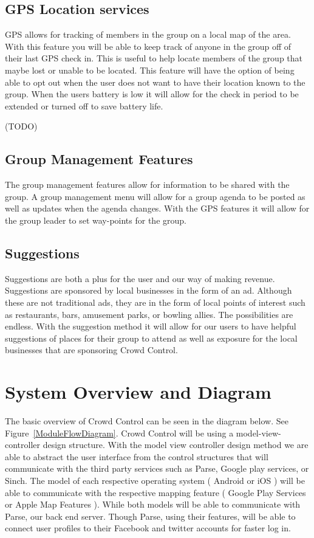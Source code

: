 \subsection{GPS Location services}
GPS allows for tracking of members in the group on a local map of the area. With this feature you will be able to keep track of anyone in the group off of their last GPS check in. This is useful to help locate members of the group that maybe lost or unable to be located. This feature will have the option of being able to opt out when the user does not want to have their location known to the group. When the users battery is low it will allow for the check in period to be extended or turned off to save battery life.

(TODO)

\subsection{Group Management Features}
The group management features allow for information to be shared with the group. A group management menu will allow for a group agenda to be posted as well as updates when the agenda changes. With the GPS features it will allow for the group leader to set way-points for the group.  

\subsection{Suggestions}
Suggestions are both a plus for the user and our way of making revenue. Suggestions are sponsored by local businesses in the form of an ad. Although these are not traditional ads, they are in the form of local points of interest such as restaurants, bars, amusement parks, or bowling allies. The possibilities are endless. With the suggestion method it will allow for our users to have helpful suggestions of places for their group to attend as well as exposure for the local businesses that are sponsoring Crowd Control.


\section{System Overview and Diagram}
The basic overview of Crowd Control can be seen in the diagram below. See Figure~\ref{ModuleFlowDiagram}. Crowd Control will be using a model-view-controller design structure. With the model view controller design method we are able to abstract the user interface from the control structures that will communicate with the third party services such as Parse, Google play services, or Sinch. The model of each respective operating system ( Android or iOS ) will be able to communicate with the respective mapping feature ( Google Play Services or Apple Map Features ). While both models will be able to communicate with Parse, our back end server. Though Parse, using their features, will be able to connect user profiles to their Facebook and twitter accounts for faster log in.

